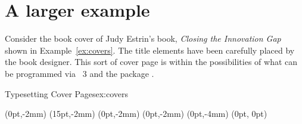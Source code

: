 \section{A larger example}

Consider the book cover of Judy Estrin’s book, \emph{Closing the Innovation Gap} shown in Example~\ref{ex:covers}. The title elements have been carefully placed by the book designer. This sort
of cover page is within the possibilities of what can be programmed via \latex~3 and the package .

\begin{texexample}{Typesetting Cover Pages}{ex:covers}  
\bgroup
\parindent0pt
\NewCoffin\ci
\NewCoffin\cii
\NewCoffin\ciii
\NewCoffin\civ

\NewCoffin\slogan
\NewCoffin\ImageCoffin
\NewCoffin\AuthorCoffin

\DeclareDocumentCommand\fonta{}
  {
      \color{white}\LARGE\bfseries\sffamily
  }

\DeclareDocumentCommand\fontb{}
  {
      \color{white}\large\bfseries\sffamily
  }  
\SetHorizontalCoffin\Result{}
\SetHorizontalCoffin{} 
\SetHorizontalCoffin{}
\SetHorizontalCoffin{}
\SetHorizontalCoffin{}

\SetVerticalCoffin{}

\SetHorizontalCoffin{}
  
\SetHorizontalCoffin{}

\JoinCoffins\Result\ci
\JoinCoffins\Result[hc,b]    \cii[hc,t](0pt,-2mm)%
\JoinCoffins\Result[l,b]       \ciii[l,t](15pt,-2mm)%
\JoinCoffins{} \civ[l,t](0pt,-2mm)
\JoinCoffins\Result[l,b]      \slogan[l,t](0pt,-2mm)
\JoinCoffins\Result[hc,b]   \AuthorCoffin[hc,t](0pt,-4mm)
\JoinCoffins\Result[r,b]      \ImageCoffin[l,b](0pt, 0pt)
  \colorbox{black}{\color{white}\TypesetCoffin\Result}

\egroup
\end{texexample}

